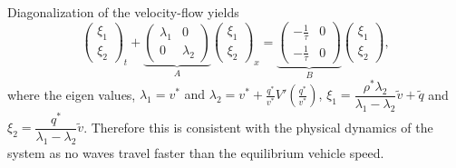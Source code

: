 \documentclass[a4paper, 10pt, conference]{ieeeconf}      %
\begin{document}
Diagonalization of the velocity-flow yields
{\footnotesize
\begin{equation} \label{vqlindiag}
\begin{pmatrix}
\xi_1 \\ \xi_2
\end{pmatrix}_t + 
\underset{A}{
	\underbrace{
	\begin{pmatrix}
		\lambda_1 & 0 \\
		0 & \lambda_2
	\end{pmatrix} 
	}
}
\begin{pmatrix}
\xi_1 \\ \xi_2
\end{pmatrix}_x = 
\underset{B}{
	\underbrace{
	\begin{pmatrix}
		-\frac{1}{\tau} & 0 \\
		-\frac{1}{\tau} & 0
	\end{pmatrix}}
}
\begin{pmatrix}
\xi_1 \\ \xi_2
\end{pmatrix},
\end{equation}
}
where the eigen values, {\footnotesize$\lambda_1 = v^{*}$ and $\lambda_2 = v^{*} + \frac{q^{*}}{v^{*}} V'(\frac{q^{*}}{v^{*}})$, $\xi_1 = \dfrac{\rho^*\lambda_2}{\lambda_1 - \lambda_2}\tilde{v} + \tilde{q}$} and {\footnotesize$\xi_2 = \dfrac{q^*}{\lambda_1 - \lambda_2}\tilde{v}$}.
Therefore this is consistent with the physical dynamics of the system as no waves travel faster than the equilibrium vehicle speed.\\
\end{document}
